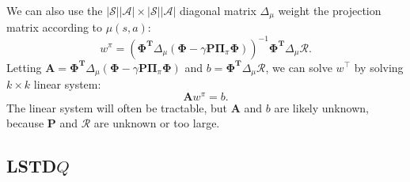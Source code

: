 \documentclass{article}
\newcommand{\parens}[1]{\left(#1\right)}
\newcommand{\abs}[1]{\left|#1\right|}
\begin{document}
We can also use the $\abs{\mathcal{S}}\abs{\mathcal{A}}\times \abs{\mathcal{S}}\abs{\mathcal{A}}$ diagonal matrix $\Delta_{\mu}$ weight the projection matrix according to  $\mu(s,a)$:
\[
	w^{\pi}=\parens{\mathbf{\Phi}^{\mathbf{T}}\Delta_{\mu}\parens{\mathbf{\Phi}-\gamma \mathbf{P}\mathbf{\Pi}_{\pi}\mathbf{\Phi}}}^{-1}\mathbf{\Phi}^{\mathbf{T}}\Delta_{\mu}\mathcal{R}.
\]
Letting $\mathbf{A}=\mathbf{\Phi}^{\mathbf{T}}\Delta_{\mu}\parens{\mathbf{\Phi}-\gamma \mathbf{P}\mathbf{\Pi}_{\pi}\mathbf{\Phi}}$ and $b=\mathbf{\Phi}^{\mathbf{T}}\Delta_{\mu}\mathcal{R}$, we can solve $w^\intercal$ by solving $k\times k$ linear system:
\[
	\mathbf{A}w^{\pi}=b.
\]
The linear system will often be tractable, but $\mathbf{A}$ and $b$ are likely unknown, because $\mathbf{P}$ and $\mathcal{R}$ are unknown or too large.

\subsection*{LSTD$Q$} %
\label{sub:lstd_q_}

\end{document}
